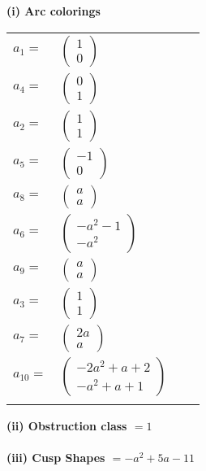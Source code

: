 \documentclass[1p]{elsarticle_modified}
\theoremstyle{definition}
\begin{document}
\flushleft \textbf{(i) Arc colorings}\\
\begin{tabular}{m{7pt} m{180pt} m{7pt} m{180pt} }
\flushright $a_{1}=$&$\begin{pmatrix}1\\0\end{pmatrix}$ \\
\flushright $a_{4}=$&$\begin{pmatrix}0\\1\end{pmatrix}$ \\
\flushright $a_{2}=$&$\begin{pmatrix}1\\1\end{pmatrix}$ \\
\flushright $a_{5}=$&$\begin{pmatrix}-1\\0\end{pmatrix}$ \\
\flushright $a_{8}=$&$\begin{pmatrix}a\\a\end{pmatrix}$ \\
\flushright $a_{6}=$&$\begin{pmatrix}- a^2-1\\- a^2\end{pmatrix}$ \\
\flushright $a_{9}=$&$\begin{pmatrix}a\\a\end{pmatrix}$ \\
\flushright $a_{3}=$&$\begin{pmatrix}1\\1\end{pmatrix}$ \\
\flushright $a_{7}=$&$\begin{pmatrix}2 a\\a\end{pmatrix}$ \\
\flushright $a_{10}=$&$\begin{pmatrix}-2 a^2+a+2\\- a^2+a+1\end{pmatrix}$\\&\end{tabular}
\flushleft \textbf{(ii) Obstruction class $= 1$}\\~\\
\flushleft \textbf{(iii) Cusp Shapes $= - a^2+5 a-11$}\\~\\
\end{document}
